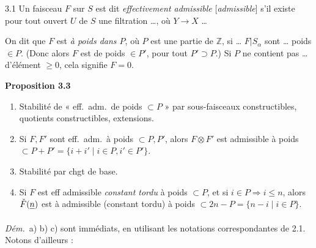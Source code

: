 \documentclass[11pt,a4paper]{article}
\begin{document}
3.1 Un faisceau $F$ sur $S$ est dit \emph{effectivement admissible}
\struck{\ill{}} [\emph{admissible}] s'il existe pour tout ouvert $U$ de $S$
  une
filtration …, où $Y \to X$ …

On dit que $F$ est \emph{à poids dans $P$}, où $P$ est une partie de
$\mathbb{Z}$, si …  $F|S_{\alpha}$ sont
 … poids $\in P$. (Donc 
alors $F$ est de poids $\in P'$, pour tout $P' \supset P$.)
Si  \struck{\ill{}} $P$ ne contient pas …
d'élément $\geqslant 0$, cela signifie $F = 0$.


\textbf{Proposition 3.3} 
\begin{enumerate}
\item[a)] Stabilité de « eff.\ adm.\ de poids $\subset P$ » par
sous-faisceaux constructibles, quotients constructibles,  extensions.
\item[b)] Si $F, F'$ sont eff.\ adm.\ à poids $\subset P, P'$, alors
$F \otimes F'$ est admissible à poids
$\subset P + P' = \{ i+i' \mid i \in P, i' \in P' \}$.
\item[c)] Stabilité par chgt de base.
\item[d)] Si $F$ est  eff admissible \emph{constant
tordu} à poids $\subset P$, et si $i \in P \Rightarrow i \leqslant n$, alors
$\check{F}(\struck{n})$ est à admissible (constant tordu) à
poids $\subset 2n - P = \{ n-i \mid i \in P \}$.
\end{enumerate}

\emph{Dém.}\ a) b) c) sont immédiats, en utilisant les notations
correspondantes de 2.1. Notons d'ailleurs :
\end{document}
